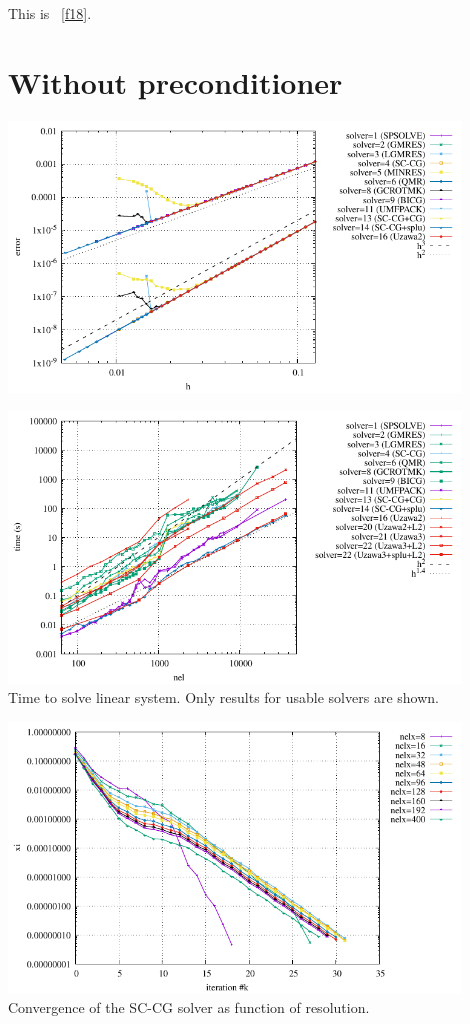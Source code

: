 This \stone is \stone~\ref{f18}.

\section*{Without preconditioner}

\begin{center}
\includegraphics[width=12cm]{python_codes/fieldstone_147/RESULTS/errors.pdf}
\end{center}

\begin{center}
\includegraphics[width=12cm]{python_codes/fieldstone_147/RESULTS/solve.pdf}\\
{\captionfont Time to solve linear system. Only results for usable solvers are shown.}
\end{center}

\begin{center}
\includegraphics[width=12cm]{python_codes/fieldstone_147/RESULTS/convergence_schur_cpl.pdf}\\
{\captionfont Convergence of the SC-CG solver as function of resolution.}
\end{center}

